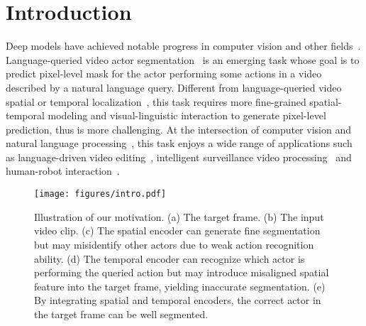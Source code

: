 \documentclass[final]{cvpr}
\begin{document}
\section{Introduction}
Deep models have achieved notable progress in computer vision and other fields~\cite{gao2020adversarialnas, liao2020ppdm, liao2019gps, huang2020ordnet}. 
Language-queried video actor segmentation~\cite{gavrilyuk2018actor} is an emerging task whose goal is to predict pixel-level mask for the actor performing some actions in a video described by a natural language query. 
Different from language-queried video spatial or temporal localization~\cite{yamaguchi2017spatio, chen2019localizing, anne2017localizing, zhang2019man}, this task requires more fine-grained spatial-temporal modeling and visual-linguistic interaction to generate pixel-level prediction, thus is more challenging. 
At the intersection of computer vision and natural language processing~\cite{huang2020referring, hui2020linguistic, yu2020cross, liao2020real, gao2020interactgan, ren2020scene}, this task enjoys a wide range of applications such as language-driven video editing~\cite{li2020mani}, intelligent surveillance video processing~\cite{sreenu2019intelligent} and human-robot interaction~\cite{qi2020reverie}.

\begin{figure}[t]
   \begin{center}
      \texttt{[image: figures/intro.pdf]}
   \end{center}
      \caption{Illustration of our motivation. (a) The target frame. (b) The input video clip. (c) The spatial encoder can generate fine segmentation but may misidentify other actors due to weak action recognition ability. (d) The temporal encoder can recognize which actor is performing the queried action but may introduce misaligned spatial feature into the target frame, yielding inaccurate segmentation. (e) By integrating spatial and temporal encoders, the correct actor in the target frame can be well segmented.}
   \label{fig:intro}
\end{figure}
\end{document}
